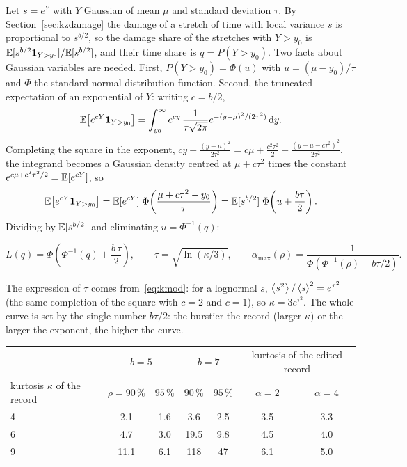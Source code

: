 Let $s = e^{Y}$ with $Y$ Gaussian of mean $\mu$ and standard deviation $\tau$. By
Section~\ref{sec:kzdamage} the damage of a stretch of time with local variance $s$ is proportional to
$s^{b/2}$, so the damage share of the stretches with $Y > y_0$ is $\mathbb{E}[s^{b/2}\mathbf 1_{Y>y_0}]
/ \mathbb{E}[s^{b/2}]$, and their time share is $q = P(Y > y_0)$. Two facts about Gaussian variables are
needed. First, $P(Y > y_0) = \Phi(u)$ with $u = (\mu - y_0)/\tau$ and $\Phi$ the standard normal
distribution function. Second, the truncated expectation of an exponential of $Y$: writing $c = b/2$,
\begin{equation}
  \mathbb{E}\bigl[e^{cY}\mathbf 1_{Y>y_0}\bigr] = \int_{y_0}^\infty e^{cy}\,\frac{1}{\tau\sqrt{2\pi}}
  e^{-(y-\mu)^2/(2\tau^2)}\,\mathrm{d} y .
\end{equation}
Completing the square in the exponent, $cy - \frac{(y-\mu)^2}{2\tau^2} = c\mu + \frac{c^2\tau^2}{2}
- \frac{(y-\mu-c\tau^2)^2}{2\tau^2}$, the integrand becomes a Gaussian density centred at
$\mu + c\tau^2$ times the constant $e^{c\mu + c^2\tau^2/2} = \mathbb{E}[e^{cY}]$, so
\begin{equation}
  \mathbb{E}\bigl[e^{cY}\mathbf 1_{Y>y_0}\bigr] = \mathbb{E}[e^{cY}]\;\Phi\!\left(\frac{\mu + c\tau^2 - y_0}{\tau}\right)
  = \mathbb{E}[s^{b/2}]\;\Phi\!\left(u + \frac{b\tau}{2}\right).
\end{equation}
Dividing by $\mathbb{E}[s^{b/2}]$ and eliminating $u = \Phi^{-1}(q)$:
\begin{result}
\begin{equation}\label{eq:lognlorenz}
  L(q) = \Phi\!\left(\Phi^{-1}(q) + \frac{b\,\tau}{2}\right),\qquad
  \tau = \sqrt{\ln(\kappa/3)},\qquad
  \alpha_{\max}(\rho) = \frac{1}{\Phi\!\left(\Phi^{-1}(\rho) - b\tau/2\right)} .
\end{equation}
\end{result}
The expression of $\tau$ comes from~\eqref{eq:kmod}: for a lognormal $s$, $\left\langle s^2 \right\rangle/\left\langle s \right\rangle^2 =
e^{\tau^2}$ (the same completion of the square with $c = 2$ and $c = 1$), so $\kappa = 3e^{\tau^2}$.
The whole curve is set by the single number $b\tau/2$: the burstier the record (larger $\kappa$) or the
larger the exponent, the higher the curve.

\begin{center}
\begin{tabular}{lcccccc}
\toprule
& \multicolumn{2}{c}{$b = 5$} & \multicolumn{2}{c}{$b = 7$} & \multicolumn{2}{c}{kurtosis of the edited record} \\
kurtosis $\kappa$ of the record & $\rho = 90\,\%$ & $95\,\%$ & $90\,\%$ & $95\,\%$ & $\alpha = 2$ & $\alpha = 4$ \\
\midrule
4 & 2.1 & 1.6 & 3.6 & 2.5 & 3.5 & 3.3 \\
6 & 4.7 & 3.0 & 19.5 & 9.8 & 4.5 & 4.0 \\
9 & 11.1 & 6.1 & 118 & 47 & 6.1 & 5.0 \\
\bottomrule
\end{tabular}
\end{center}

